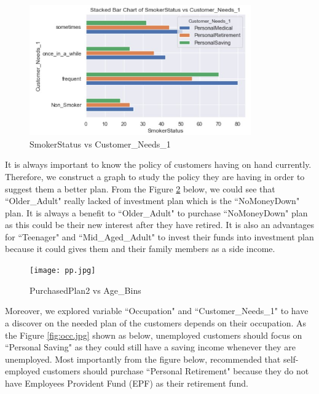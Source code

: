 \documentclass[11pt]{article}
\begin{document}
 \begin{figure}[H]
     \centering
     \includegraphics[width=0.85\textwidth]{cn.jpg}
     \caption{SmokerStatus vs Customer\_Needs\_1}
     \label{fig:cn.jpg}
 \end{figure}
\vspace{0.3cm}

\hspace{0.5cm} It is always important to know the policy of customers having on hand currently. Therefore, we construct a graph to study the policy they are having in order to suggest them a better plan. From the Figure \ref{fig:pp.jpg} below, we could see that ``Older\_Adult" really lacked of investment plan which is the ``NoMoneyDown" plan. It is always a benefit to ``Older\_Adult" to purchase ``NoMoneyDown" plan as this could be their new interest after they have retired. It is also an advantages for ``Teenager" and ``Mid\_Aged\_Adult" to invest their funds into investment plan because it could gives them and their family members as a side income. \vspace{0.3cm}

 \begin{figure}[H] 
     \centering
     \texttt{[image: pp.jpg]}
     \caption{PurchasedPlan2 vs Age\_Bins}
     \label{fig:pp.jpg}
 \end{figure}
\vspace{0.3cm}


\hspace{0.5cm}  Moreover, we explored variable ``Occupation" and ``Customer\_Needs\_1" to have a discover on the needed plan of the customers depends on their occupation. As the Figure \ref{fig:occ.jpg} shown as below, unemployed customers should focus on ``Personal Saving" as they could still have a saving income whenever they are unemployed. Most importantly from the figure below, recommended that self-employed customers should purchase ``Personal Retirement" because they do not have Employees Provident Fund (EPF) as their retirement fund. 
\end{document}
